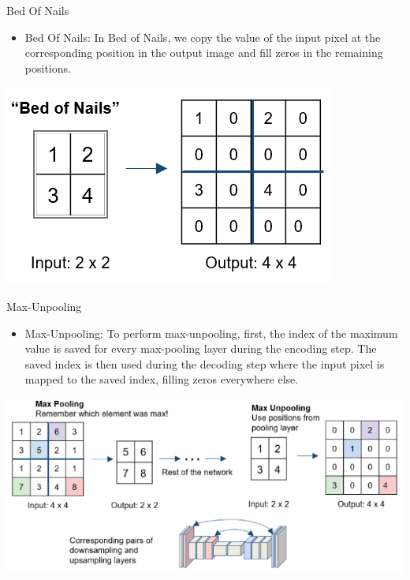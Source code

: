 \documentclass[default, aspectratio=169]{beamer}
\begin{document}
	\begin{frame}{Bed Of Nails}
		\vspace{0.5cm}
		\begin{itemize}
			\item {Bed Of Nails}: In Bed of Nails, we copy the value of the input pixel at the corresponding position in the output image and fill zeros in the remaining positions.
		\end{itemize}
		
		\centering
		\includegraphics[keepaspectratio, scale=0.4]{pic/Upsamlpe_3.png}
		
	\end{frame}
	
	\begin{frame}{Max-Unpooling}
		\vspace{0.5cm}
		\begin{itemize}
			\item {Max-Unpooling}: To perform max-unpooling, first, the index of the maximum value is saved for every max-pooling layer during the encoding step. The saved index is then used during the decoding step where the input pixel is mapped to the saved index, filling zeros everywhere else.
		\end{itemize}
		
		\centering
		\includegraphics[keepaspectratio, scale=0.3]{pic/Upsamlpe_4.png}
	\end{frame}
	
\end{document}
